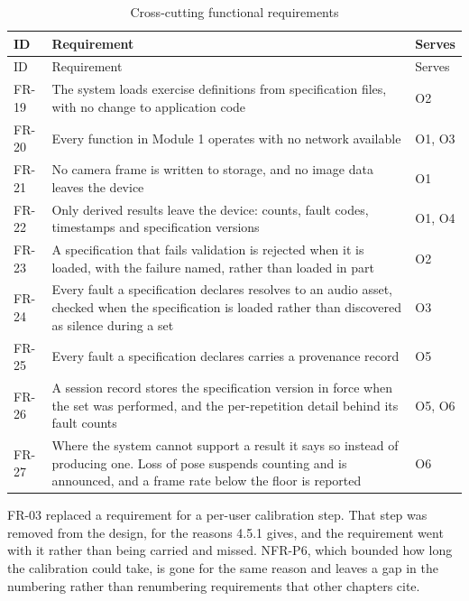 {\small
\setlength{\LTpre}{6pt}\setlength{\LTpost}{8pt}
\begin{longtable}{>{\raggedright\arraybackslash}p{}>{\raggedright\arraybackslash}p{}>{\raggedright\arraybackslash}p{}}
\caption{Cross-cutting functional requirements}\\
\toprule
ID & Requirement & Serves \\
\midrule
\endfirsthead
\toprule
ID & Requirement & Serves \\
\midrule
\endhead
\bottomrule
\endfoot
\bottomrule
\endlastfoot
FR-19 & The system loads exercise definitions from specification files, with no change to application code & O2 \\
FR-20 & Every function in Module 1 operates with no network available & O1, O3 \\
FR-21 & No camera frame is written to storage, and no image data leaves the device & O1 \\
FR-22 & Only derived results leave the device: counts, fault codes, timestamps and specification versions & O1, O4 \\
FR-23 & A specification that fails validation is rejected when it is loaded, with the failure named, rather than loaded in part & O2 \\
FR-24 & Every fault a specification declares resolves to an audio asset, checked when the specification is loaded rather than discovered as silence during a set & O3 \\
FR-25 & Every fault a specification declares carries a provenance record & O5 \\
FR-26 & A session record stores the specification version in force when the set was performed, and the per-repetition detail behind its fault counts & O5, O6 \\
FR-27 & Where the system cannot support a result it says so instead of producing one. Loss of pose suspends counting and is announced, and a frame rate below the floor is reported & O6 \\
\end{longtable}
}

FR-03 replaced a requirement for a per-user calibration step. That step was removed from the design, for the reasons 4.5.1 gives, and the requirement went with it rather than being carried and missed. NFR-P6, which bounded how long the calibration could take, is gone for the same reason and leaves a gap in the numbering rather than renumbering requirements that other chapters cite.

